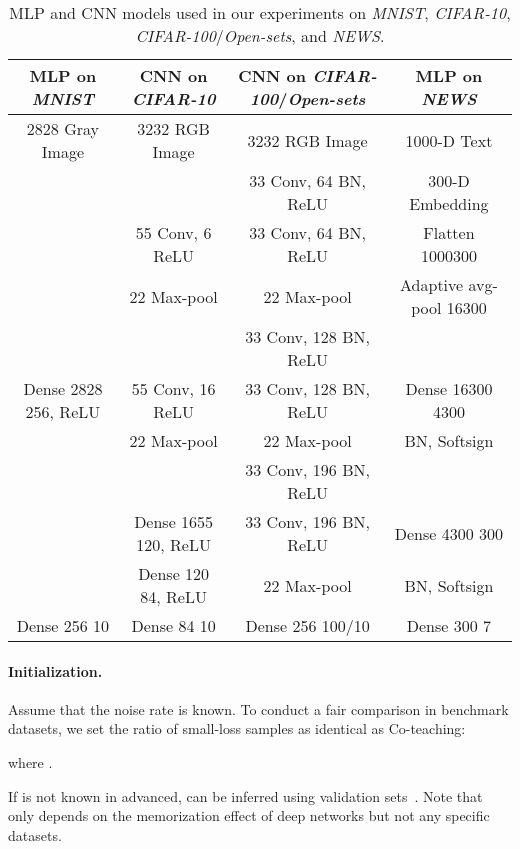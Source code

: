 \documentclass{article}
\begin{document}
\begin{table*}[!h]\small
	\centering
	\caption{MLP and CNN models used in our experiments on \textit{MNIST}, \textit{CIFAR-10}, \textit{CIFAR-100}/\textit{Open-sets}, and \textit{NEWS}.}
	\label{tab:netstuc}
	\scalebox{0.84}
	{
		\begin{tabular}{c | c | c | c}
			\hline
			MLP on \textit{MNIST} & CNN on \textit{CIFAR-10} & CNN on \textit{CIFAR-100}/\textit{Open-sets} & MLP on \textit{NEWS} \\ \hline
			2828 Gray Image & 3232 RGB Image & 3232 RGB Image & 1000-D Text  \\ \hline
			& & 33 Conv, 64 BN, ReLU  & 300-D Embedding  \\
			& 55 Conv, 6 ReLU  & 33 Conv, 64 BN, ReLU  & Flatten  1000300 \\
			& 22 Max-pool & 22 Max-pool & Adaptive avg-pool  16300 \\
            \cline{2-4}

		    & & 33 Conv, 128 BN, ReLU  & \\
		Dense 2828  256, ReLU	& 55 Conv, 16 ReLU & 33 Conv, 128 BN, ReLU  &   Dense 16300  4300  \\
			& 22 Max-pool & 22 Max-pool &   BN, Softsign \\
            \cline{2-4}

			&  & 33 Conv, 196 BN, ReLU  &   \\
			& Dense 1655  120, ReLU & 33 Conv, 196 BN, ReLU  &   Dense 4300  300 \\
			& Dense 120  84, ReLU & 22 Max-pool &    BN, Softsign  \\
			\hline

        Dense 256  10 & Dense 84  10 & Dense 256  100/10 &  Dense 300  7\\ \hline
		\end{tabular}
	}
\end{table*}

\paragraph{Initialization.}
Assume that the noise rate  is known. To conduct a fair comparison in benchmark datasets, we set the ratio of small-loss samples  as identical as Co-teaching:

where .

If   is not known in advanced,  can be inferred using validation sets~\cite{liu2016classification,yu2018efficient}.
Note that  only depends on the memorization effect of deep networks but not any specific datasets.
\end{document}
